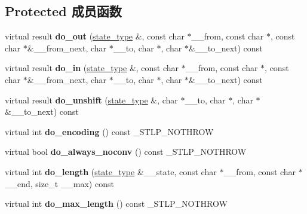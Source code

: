 \subsection*{Protected 成员函数}
\begin{DoxyCompactItemize}
\item 
\mbox{\label{classcodecvt_3_01char_00_01char_00_01mbstate__t_01_4_a743e1ad9101e56aa6da2144d236627ac}} 
virtual result {\bfseries do\+\_\+out} (\hyperlink{struct____mbstate__t}{state\+\_\+type} \&, const char $\ast$\+\_\+\+\_\+from, const char $\ast$, const char $\ast$\&\+\_\+\+\_\+from\+\_\+next, char $\ast$\+\_\+\+\_\+to, char $\ast$, char $\ast$\&\+\_\+\+\_\+to\+\_\+next) const
\item 
\mbox{\label{classcodecvt_3_01char_00_01char_00_01mbstate__t_01_4_adc9e27d7625df0159a38962161c1d5b3}} 
virtual result {\bfseries do\+\_\+in} (\hyperlink{struct____mbstate__t}{state\+\_\+type} \&, const char $\ast$\+\_\+\+\_\+from, const char $\ast$, const char $\ast$\&\+\_\+\+\_\+from\+\_\+next, char $\ast$\+\_\+\+\_\+to, char $\ast$, char $\ast$\&\+\_\+\+\_\+to\+\_\+next) const
\item 
\mbox{\label{classcodecvt_3_01char_00_01char_00_01mbstate__t_01_4_a9624f281b38b114deeac590d55fa4e11}} 
virtual result {\bfseries do\+\_\+unshift} (\hyperlink{struct____mbstate__t}{state\+\_\+type} \&, char $\ast$\+\_\+\+\_\+to, char $\ast$, char $\ast$\&\+\_\+\+\_\+to\+\_\+next) const
\item 
\mbox{\label{classcodecvt_3_01char_00_01char_00_01mbstate__t_01_4_a5fca3ba3854b861f6bedbe48d3848f1d}} 
virtual int {\bfseries do\+\_\+encoding} () const \+\_\+\+S\+T\+L\+P\+\_\+\+N\+O\+T\+H\+R\+OW
\item 
\mbox{\label{classcodecvt_3_01char_00_01char_00_01mbstate__t_01_4_ac41592fec808a8027124d02f8fa4eaa5}} 
virtual bool {\bfseries do\+\_\+always\+\_\+noconv} () const \+\_\+\+S\+T\+L\+P\+\_\+\+N\+O\+T\+H\+R\+OW
\item 
\mbox{\label{classcodecvt_3_01char_00_01char_00_01mbstate__t_01_4_aa2b0536f7b1c60a871d7de10ba314f79}} 
virtual int {\bfseries do\+\_\+length} (\hyperlink{struct____mbstate__t}{state\+\_\+type} \&\+\_\+\+\_\+state, const char $\ast$\+\_\+\+\_\+from, const char $\ast$\+\_\+\+\_\+end, size\+\_\+t \+\_\+\+\_\+max) const
\item 
\mbox{\label{classcodecvt_3_01char_00_01char_00_01mbstate__t_01_4_a0ece4eceb0b49e6f75868c06785f38a0}} 
virtual int {\bfseries do\+\_\+max\+\_\+length} () const \+\_\+\+S\+T\+L\+P\+\_\+\+N\+O\+T\+H\+R\+OW
\end{DoxyCompactItemize}


